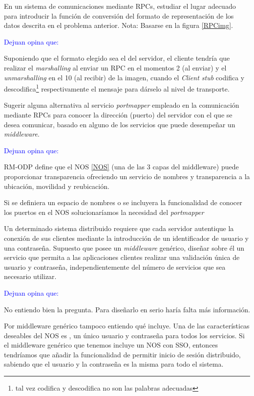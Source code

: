   \begin{problem}[3]
  En un sistema de comunicaciones mediante RPCs, estudiar el lugar adecuado
para introducir la función de conversión del formato de representación de los
datos descrita en el problema anterior. Nota: Basarse en la figura \ref{RPCimg}.
  \solution

\textcolor{blue}{Dejuan opina que:}

Suponiendo que el formato elegido sea el del servidor, el cliente tendría que realizar el \textit{marshalling} al enviar un RPC en el momentos 2 (al enviar) y el \textit{unmarshalling} en el 10 (al recibir) de la imagen, cuando el \textit{Client stub} codifica y descodifica\footnote{tal vez codifica y descodifica no son las palabras adecuadas} respectivamente el mensaje para dárselo al nivel de transporte.

  \end{problem}

  \begin{problem}[4]
  Sugerir alguna alternativa al servicio \textit{portmapper} empleado en la
comunicación mediante RPCs para conocer la dirección (puerto) del servidor
con el que se desea comunicar, basado en alguno de los servicios que puede
desempeñar un \textit{middleware}.
  \solution

\textcolor{blue}{Dejuan opina que:}


RM-ODP define que el NOS \ref{NOS} (una de las 3 capas del middleware) puede proporcionar transparencia ofreciendo un servicio de nombres y transparencia a la ubicación, movilidad y reubicación.

Si se definiera un espacio de nombres o se incluyera la funcionalidad de conocer los puertos en el NOS solucionaríamos la necesidad del \textit{portmapper}

  \end{problem}

  \begin{problem}[5]
  Un determinado sistema distribuido requiere que cada servidor autentique
  la conexión de sus clientes mediante la introducción de un
  identificador de usuario y una contraseña. Supuesto que posee un
  \textit{middleware} genérico, diseñar sobre él un servicio que permita a las
aplicaciones clientes realizar una validación única de usuario y contraseña,
independientemente del número de servicios que sea necesario utilizar.
  \solution

\textcolor{blue}{Dejuan opina que:} 


No entiendo bien la pregunta. Para diseñarlo en serio haría falta más información.

Por middleware genérico tampoco entiendo qué incluye. Una de las características deseables del NOS es , un único usuario y contraseña para todos los servicios. Si el middleware genérico que tenemos incluye un NOS con SSO, entonces tendríamos que añadir la funcionalidad de permitir inicio de sesión distribuido, sabiendo que el usuario y la contraseña es la misma para todo el sistema. 

  \end{problem}

